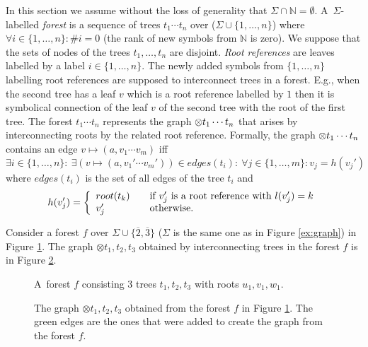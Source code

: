 \documentclass[a4paper, 12pt]{article}
\begin{document}
In this section we assume without the loss of generality that $\Sigma \cap \mathbb{N} = \emptyset$.
A~$\Sigma$-labelled \emph{forest} is a sequence of trees $t_1 \cdots t_n$ over ($\Sigma \cup \{1,\ldots,n\}$)
where $\forall i \in \{1,\ldots,n\}: \#i = 0$ (the rank of new symbols from $\mathbb{N}$ is zero).
We suppose that the sets of nodes of the trees $t_1, \ldots, t_n$ are disjoint.
\emph{Root references} are leaves labelled by a label $i \in \{1,\ldots,n\}$.
The newly added symbols from $\{1,\ldots,n\}$ labelling root references are
supposed to interconnect trees in a forest.
E.g., when the second tree has a leaf $v$ which is a root reference labelled by $1$
then it is symbolical connection of the leaf $v$ of the second tree
with the root of the first tree.
The forest $t_1 \cdots t_n$ represents the graph $\otimes t_1 \cdots t_n$ that arises
by interconnecting roots by the related root reference.
Formally, the graph $\otimes t_1 \cdots t_n$ contains an edge $v \mapsto (a,v_1 \cdots v_m)$ iff $\exists i \in \{1, \ldots, n\}:\ \exists(v \mapsto (a, v_1' \cdots v_m')) \in edges(t_i):
\ \forall j \in \{1,\ldots,m\}: v_j = h(v_j')$ where $edges(t_i)$ is the set of all edges of the tree $t_i$ and
\[ h(v_j') = \left\{
  \begin{array}{l l}
  root(t_k) & \quad \text{if $v_j'$ is a root reference with $l(v_j') = k$}\\
  v_j'   & \quad \text{otherwise.}
  \end{array} \right.\]

Consider a forest $f$ over $\Sigma \cup \{\overline{2}, \overline{3}\}$
($\Sigma$ is the same one as in Figure \ref{ex:graph}) in Figure \ref{fig:forest}.
The graph $\otimes t_1,t_2,t_3$ obtained by interconnecting trees in the forest $f$ is in Figure \ref{fig:forest_graph}.

	\begin{figure}[bth]
	\begin{center}
		\scalebox{1}
		{
			
			\hspace{0.55cm}
			
			\hspace{0.55cm}
			
		}
		\caption{A~forest $f$ consisting 3 trees $t_1, t_2, t_3$ with roots $u_1, v_1, w_1$.}
	  \label{fig:forest}
	\end{center}
	\end{figure}

	\begin{figure}[bth]
	\begin{center}
		
		\caption{The graph $\otimes t_1,t_2,t_3$ obtained from the forest $f$ in Figure \ref{fig:forest}.
		The green edges are the ones that were added to create the graph from the forest $f$.}
	  \label{fig:forest_graph}
	\end{center}
	\end{figure}
\vspace{-0.5cm}
\end{document}

